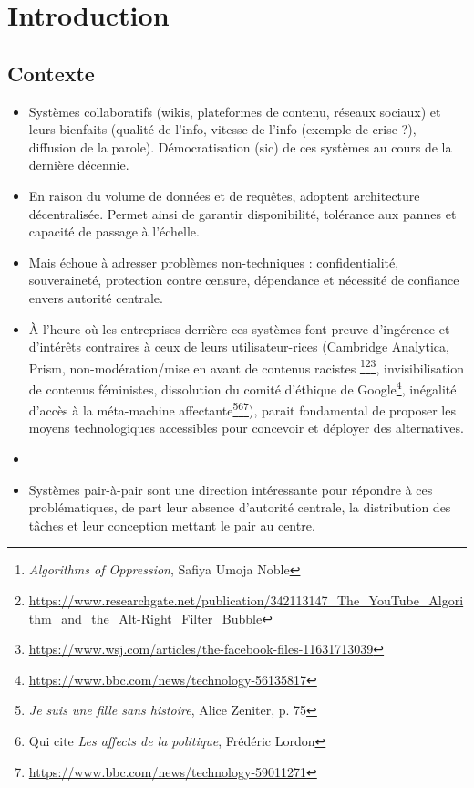 \documentclass[12pt]{thesul}
\theoremstyle{definition}
\begin{document}
\DontWriteThisInToc
\listoffigures

\mainmatter
\NumberThisInToc
\chapter*{Introduction}
\minitoc
\section{Contexte}

\begin{itemize}
  \item Systèmes collaboratifs (wikis, plateformes de contenu, réseaux sociaux) et leurs bienfaits (qualité de l'info, vitesse de l'info (exemple de crise ?), diffusion de la parole).
    Démocratisation (sic) de ces systèmes au cours de la dernière décennie.
  \item En raison du volume de données et de requêtes, adoptent architecture décentralisée.
    Permet ainsi de garantir disponibilité, tolérance aux pannes et capacité de passage à l'échelle.
  \item Mais échoue à adresser problèmes non-techniques : confidentialité, souveraineté, protection contre censure, dépendance et nécessité de confiance envers autorité centrale.
  \item À l'heure où les entreprises derrière ces systèmes font preuve d'ingérence et d'intérêts contraires à ceux de leurs utilisateur-rices (Cambridge Analytica, Prism, non-modération/mise en avant de contenus racistes \footnote{\emph{Algorithms of Oppression}, Safiya Umoja Noble}\footnote{\url{https://www.researchgate.net/publication/342113147_The_YouTube_Algorithm_and_the_Alt-Right_Filter_Bubble}}\footnote{\url{https://www.wsj.com/articles/the-facebook-files-11631713039}}, invisibilisation de contenus féministes, dissolution du comité d'éthique de Google\footnote{\url{https://www.bbc.com/news/technology-56135817}}, inégalité d'accès à la méta-machine affectante\footnote{\emph{Je suis une fille sans histoire}, Alice Zeniter, p. 75}\footnote{Qui cite \emph{Les affects de la politique}, Frédéric Lordon}\footnote{\url{https://www.bbc.com/news/technology-59011271}}), parait fondamental de proposer les moyens technologiques accessibles pour concevoir et déployer des alternatives.
  \item {}
  \item Systèmes pair-à-pair sont une direction intéressante pour répondre à ces problématiques, de part leur absence d'autorité centrale, la distribution des tâches et leur conception mettant le pair au centre.

\end{itemize}
\end{document}
